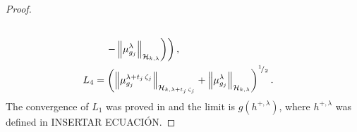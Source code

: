 \begin{proof}
\begin{equation}
\begin{aligned}
				\\
				&\quad\left.\left.-\left\|\mu_{g_{j}}^{\lambda}\right\|_{\mathcal{H}_{k,\lambda}}\right)\right),
				\\
				L_{4}&=\left(\left\|\mu_{g_{j}}^{\lambda+t_{j}\,\zeta_{j}}\right\|_{\mathcal{H}_{k,\lambda+t_{j}\,\zeta_{j}}}+\left\|\mu_{g_{j}}^{\lambda}\right\|_{\mathcal{H}_{k,\lambda}}\right)^{^{1}\!/_{2}}.
			\end{aligned}
		\end{equation}
		The convergence of $L_{1}$ was proved in \textcite[Lemma 4]{Carcamo2024} and the limit is $g\left(h^{+,\lambda}\right)$, where $h^{+,\lambda}$ was defined in {\color{orange}INSERTAR ECUACI\'{O}N}.
	\end{proof}